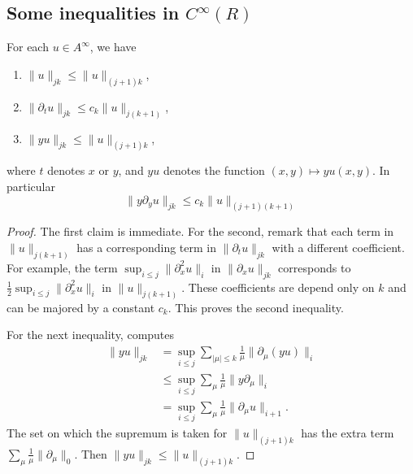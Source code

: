 \subsection{Some inequalities in  \texorpdfstring{$C^{\infty}(R)$}{CR}}

\begin{lemma}
	For each $u\in A^{\infty}$, we have

	\begin{enumerate}
		\item $\| u \|_{jk}\leq \| u \|_{(j+1)k}$,
		\item $\| \partial_tu \|_{jk}\leq c_k\| u \|_{j(k+1)}$,
		\item $\| yu \|_{jk}\leq \| u \|_{(j+1)k}$,
	\end{enumerate}
	where $t$ denotes $x$ or $y$, and $yu$ denotes the function $(x,y)\mapsto yu(x,y)$.  In particular
	\begin{equation}
		\| y\partial_yu \|_{jk}\leq c_k\| u \|_{(j+1)(k+1)}
	\end{equation}

\end{lemma}

\begin{proof}
	The first claim is immediate. For the second, remark that each term in $\| u \|_{j(k+1)}$ has a corresponding term in $\| \partial_tu \|_{jk}$ with a different coefficient. For example, the term $\sup_{i\leq j}\| \partial_x^2u \|_i$ in $\| \partial_xu \|_{jk}$ corresponds to $\frac{ 1 }{2}\sup_{i\leq j}\| \partial_x^2u \|_i$ in $\| u \|_{j(k+1)}$. These coefficients are depend only on $k$ and can be majored by a constant $c_k$. This proves the second inequality.

	For the next inequality, computes
	\begin{equation}
		\begin{split}
			\| yu \|_{jk}&=\sup_{i\leq j}\sum_{|\mu|\leq k}\frac{1}{ \mu }\| \partial_{\mu}(yu) \|_i\\
			&\leq \sup_{i\leq j}\sum_{\mu}\frac{1}{ \mu }\| y\partial_{\mu} \|_i\\
			&=\sup_{i \leq j}\sum_{\mu}\frac{1}{ \mu }\| \partial_{\mu}u \|_{i+1}.
		\end{split}
	\end{equation}
	The set on which the supremum is taken for $\| u \|_{(j+1)k}$ has the extra term $\sum_{\mu}\frac{1}{ \mu }\| \partial_{\mu}\|_0$. Then $\| yu \|_{jk}\leq \| u \|_{(j+1)k}$.

\end{proof}

